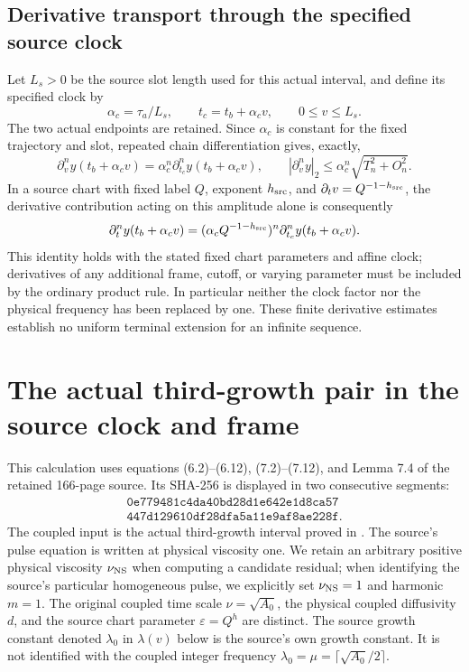 \subsection{Derivative transport through the specified source clock}

Let $L_s>0$ be the source slot length used for this actual interval,
and define its specified clock by
\[
 \alpha_c=\tau_a/L_s,\qquad
 t_c=t_b+\alpha_c v,\qquad 0\leq v\leq L_s.
\]
The two actual endpoints are retained. Since $\alpha_c$ is constant
for the fixed trajectory and slot, repeated chain differentiation
gives, exactly,
\begin{equation}\label{tgdc:clock}
 \partial_v^ny(t_b+\alpha_cv)
      =\alpha_c^n\partial_{t_c}^ny(t_b+\alpha_cv),\qquad
 |\partial_v^ny|_2\leq\alpha_c^n\sqrt{T_n^2+O_n^2}.
\end{equation}
In a source chart with fixed label $Q$, exponent $h_{\rm src}$,
and $\partial_t v=Q^{-1-h_{\rm src}}$, the derivative contribution
acting on this amplitude alone is consequently
\[
 \partial_t^ny(t_b+\alpha_cv)
  =(\alpha_cQ^{-1-h_{\rm src}})^n
                      \partial_{t_c}^ny(t_b+\alpha_cv).
\]
This identity holds with the stated fixed chart parameters and affine
clock; derivatives of any additional frame, cutoff, or varying
parameter must be included by the ordinary product rule. In particular
neither the clock factor nor the physical frequency has been replaced
by one. These finite derivative estimates establish no uniform
terminal extension for an infinite sequence.


\section{The actual third-growth pair in the source clock and frame}
\label{tgframe:section}

This calculation uses equations (6.2)--(6.12), (7.2)--(7.12), and
Lemma 7.4 of the retained 166-page source. Its SHA-256 is displayed
in two consecutive segments:
\[
\begin{gathered}
\texttt{0e779481c4da40bd28d1e642e1d8ca57}\\
\texttt{447d129610df28dfa5a11e9af8ae228f}.
\end{gathered}
\]
The coupled input is the actual third-growth interval proved in
. The source's pulse
equation is written at physical viscosity one. We retain an arbitrary
positive physical viscosity $\nu_{\rm NS}$ when computing a candidate
residual; when identifying the source's particular homogeneous pulse,
we explicitly set $\nu_{\rm NS}=1$ and harmonic $m=1$.
The original coupled time scale $\nu=\sqrt{A_0}$, the physical coupled
diffusivity $d$, and the source chart parameter $\varepsilon=Q^h$
are distinct.
The source growth constant denoted $\lambda_0$ in $\lambda(v)$ below
is the source's own growth constant. It is not identified with the
coupled integer frequency $\lambda_0=\mu=\lceil\sqrt{A_0}/2\rceil$.


